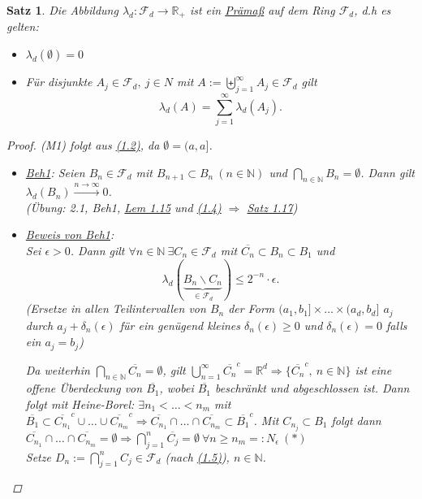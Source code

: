 \documentclass[a4paper]{scrreprt}
\newcommand{\R}{\mathbb{R}}
\newcommand{\N}{\mathbb{N}}
\newcommand{\Fd}{\mathcal{F}_d}
\newcommand{\bigdcup}{\biguplus}
\newcommand{\jlabel}[1]{\label{j_#1}}
\newcommand{\jhyperref}[2]{\hyperref[j_#1]{#2}}
\newcommand{\jlink}[1]{\jhyperref{#1}{#1}}
\theoremstyle{plain}
\newtheorem{satz}[thm]{Satz}
\theoremstyle{definition}
\begin{document}
{{{\begin{satz}
\jlabel{Satz 1.17}
    Die Abbildung $\lambda_d: \Fd \rightarrow \R_+$ ist ein \uline{Prämaß} auf dem Ring $\Fd$, d.h es gelten:
    \begin{itemize}
        \item[(M1)] $\lambda_d(\emptyset) = 0$
        \item[(M2*)] Für disjunkte $A_j\in\Fd, \ j \in N$ mit $A:=\bigdcup_{j=1}^\infty A_j \in \Fd$ gilt
            \begin{displaymath}
                \lambda_d(A) = \sum_{j=1}^\infty \lambda_d(A_j).
            \end{displaymath}
    \end{itemize}
    \begin{proof}
        (M1) folgt aus \jlink{(1.2)}, da $\emptyset = (a,a]$.
        \begin{itemize}
            \item[1)]
                \uline{Beh1}: Seien $B_n \in \Fd$ mit $B_{n+1} \subset B_n \ (n\in\N)$ und $\bigcap_{n \in\N} B_n = \emptyset$. Dann gilt $\lambda_d(B_n) \xrightarrow{n \rightarrow \infty} 0$.\\
                (Übung: 2.1, Beh1, \jlink{Lem 1.15} und \jlink{(1.4)} $\Rightarrow$ \jlink{Satz 1.17})
            \item[2)]
                \uline{Beweis von Beh1}:\\
                Sei $\epsilon > 0$. Dann gilt $\forall n \in \N \ \exists C_n \in\Fd$ mit $\overline{C_n} \subset B_n \subset B_1$ und
                \begin{displaymath}
                    \lambda_d(\underbrace{B_n \backslash C_n}_{\in \Fd}) \le 2^{-n}\cdot\epsilon.
                \end{displaymath}
                (Ersetze in allen Teilintervallen von $B_n$ der Form $(a_1,b_1]\times \dots \times (a_d, b_d]$ $a_j$ durch $a_j + \delta_n(\epsilon)$ für ein genügend kleines $\delta_n(\epsilon) \ge 0$ und $\delta_n(\epsilon) = 0$ falls ein $a_j=b_j$)
                
                Da weiterhin $\bigcap_{n\in\N} \overline{C_n} = \emptyset$, gilt $\bigcup_{n=1}^\infty \overline{C_n}^c =  \R^d \Rightarrow \{\overline{C_n}^c,\ n\in\N\}$ ist eine offene Überdeckung von $\overline{B_1}$, wobei $\overline{B_1}$ beschränkt und abgeschlossen ist. Dann folgt mit Heine-Borel: $\exists n_1 < \dots < n_m$ mit $\overline{B_1} \subset \overline{C_{n_1}}^c \cup \dots \cup \overline{C_{n_m}}^c \Rightarrow \overline{C_{n_1}} \cap \dots \cap \overline{C_{n_m}} \subset \overline{B_1}^c$. Mit $C_{n_j} \subset B_1$ folgt dann $\overline{C_{n_1}} \cap \dots \cap \overline{C_{n_m}} = \emptyset \Rightarrow \bigcap_{j=1}^n \overline{C_j} = \emptyset \ \forall n\ge n_m =: N_\epsilon \ (*)$\\
                Setze $D_n := \bigcap_{j=1}^n C_j \in \Fd$ (nach \jlink{(1.5)}), $n\in\N$.
                

\end{itemize}
\end{proof}
\end{satz}}}}
\end{document}
